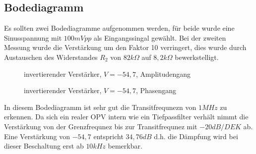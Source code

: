 \subsection{Bodediagramm}
Es sollten zwei Bodediagramme aufgenommen werden, f\"ur beide wurde eine Sinusspannung mit $100mVpp$ als Eingangssingal gew\"ahlt. Bei der zweiten Messung wurde die Verst\"arkung um den Faktor 10 verringert, dies wurde durch Austauschen des Widerstandes $R_2$ von $82k\Omega$ auf $8,2k\Omega$ bewerkstelligt.

\begin{figure}[H]
  \centering
  \caption{invertierender Verst\"arker, $V=-54,7$, Amplitudengang}
\end{figure}
\begin{figure}[H]
  \centering
  \caption{invertierender Verst\"arker, $V=-54,7$, Phasengang}
\end{figure}
\noindent
In diesem Bodediagramm ist sehr gut die Transitfrequnezn von $1MHz$ zu erkennen. Da sich ein realer OPV intern wie ein Tiefpassfilter verh\"alt nimmt die Verst\"arkung von der Grenzfrequnez bis zur Transitfrequnez mit $-20dB/DEK$ ab. Eine Verst\"arkung von $-54,7$ entspricht $34,76dB$ d.h. die D\"ampfung wird bei dieser Beschaltung erst ab $10kHz$ bemerkbar.

